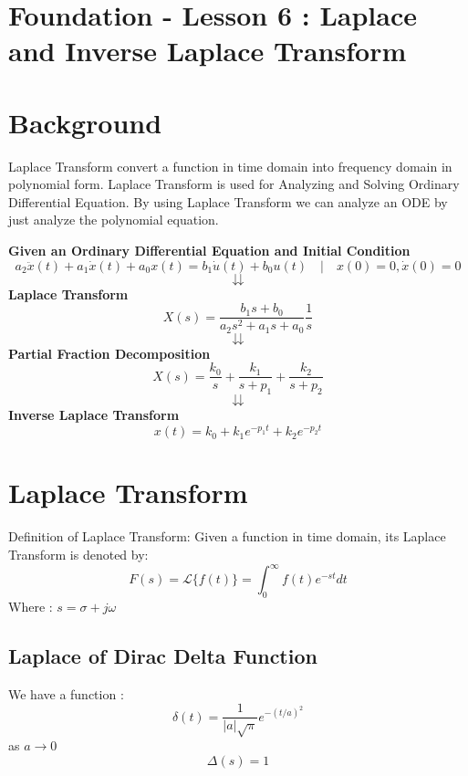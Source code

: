 \documentclass[12pt,a4paper]{article}
\begin{document}
	\section*{\centering Foundation - Lesson 6 : Laplace and Inverse Laplace Transform}
	
	
	\section{Background}
	Laplace Transform convert a function in time domain into frequency domain in polynomial form. Laplace Transform is used for Analyzing and Solving Ordinary Differential Equation. By using Laplace Transform we can analyze an ODE by just analyze the polynomial equation.
	\begin{center}
		\textbf{Given an Ordinary Differential Equation and Initial Condition}
		\[
		a_2\ddot{x}(t) + a_1\dot{x}(t)+a_0x(t)=b_1\dot{u}(t)+b_0u(t)\quad|\quad x(0) = 0,\dot{x}(0) = 0
		\]
		\[
		\downdownarrows
		\]
		\textbf{Laplace Transform}
		\[
		X(s) = \frac{b_1s+b_0}{a_2s^2+a_1s+a_0} \frac{1}{s}
		\]
		\[
		\downdownarrows
		\]
		\textbf{Partial Fraction Decomposition}
		\[
		X(s) = \frac{k_0}{s}+\frac{k_1}{s+p_1}+\frac{k_2}{s+p_2}
		\]
		\[
		\downdownarrows
		\]
		\textbf{Inverse Laplace Transform}
		\[
		x(t) = k_0 + k_1e^{-p_1t} + k_2e^{-p_2t}
		\]
	\end{center}
	
	\section{Laplace Transform}
	Definition of Laplace Transform: Given a function in time domain, its Laplace Transform is denoted by:
	\[
	F(s) = \mathcal{L}\{f(t)\} = \int_{0}^{\infty} f(t)e^{-st} dt
	\]
	Where : \(s = \sigma + j\omega\)
	
	\subsection{Laplace of Dirac Delta Function}
	We have a function :
	\[
	\delta(t) = \frac{1}{|a|\sqrt{\pi}}e^{-(t/a)^2}
	\]
	as \(a \rightarrow 0\)
	\[
	\Delta(s) = 1
	\]
	
\end{document}
